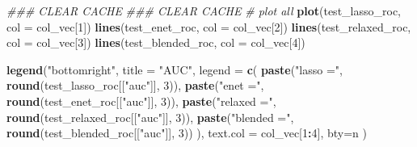 \documentclass[
]{book}
\newenvironment{Shaded}{\begin{snugshade}}{\end{snugshade}}
\newcommand{\CommentTok}[1]{\textcolor[rgb]{0.56,0.35,0.01}{\textit{#1}}}
\newcommand{\DataTypeTok}[1]{\textcolor[rgb]{0.13,0.29,0.53}{#1}}
\newcommand{\DecValTok}[1]{\textcolor[rgb]{0.00,0.00,0.81}{#1}}
\newcommand{\KeywordTok}[1]{\textcolor[rgb]{0.13,0.29,0.53}{\textbf{#1}}}
\newcommand{\NormalTok}[1]{#1}
\newcommand{\OperatorTok}[1]{\textcolor[rgb]{0.81,0.36,0.00}{\textbf{#1}}}
\newcommand{\StringTok}[1]{\textcolor[rgb]{0.31,0.60,0.02}{#1}}
\begin{document}
\begin{Shaded}
\begin{Highlighting}[]
\CommentTok{\#\#\# CLEAR CACHE}
\CommentTok{\#\#\# CLEAR CACHE}
\CommentTok{\# plot all}
\KeywordTok{plot}\NormalTok{(test\_lasso\_roc, }\DataTypeTok{col =}\NormalTok{ col\_vec[}\DecValTok{1}\NormalTok{])}
\KeywordTok{lines}\NormalTok{(test\_enet\_roc, }\DataTypeTok{col =}\NormalTok{ col\_vec[}\DecValTok{2}\NormalTok{])}
\KeywordTok{lines}\NormalTok{(test\_relaxed\_roc, }\DataTypeTok{col =}\NormalTok{ col\_vec[}\DecValTok{3}\NormalTok{])}
\KeywordTok{lines}\NormalTok{(test\_blended\_roc, }\DataTypeTok{col =}\NormalTok{ col\_vec[}\DecValTok{4}\NormalTok{])}

\KeywordTok{legend}\NormalTok{(}\StringTok{"bottomright"}\NormalTok{,}
  \DataTypeTok{title =} \StringTok{"AUC"}\NormalTok{,}
  \DataTypeTok{legend =} \KeywordTok{c}\NormalTok{(}
    \KeywordTok{paste}\NormalTok{(}\StringTok{"lasso ="}\NormalTok{, }\KeywordTok{round}\NormalTok{(test\_lasso\_roc[[}\StringTok{"auc"}\NormalTok{]], }\DecValTok{3}\NormalTok{)),}
    \KeywordTok{paste}\NormalTok{(}\StringTok{"enet ="}\NormalTok{, }\KeywordTok{round}\NormalTok{(test\_enet\_roc[[}\StringTok{"auc"}\NormalTok{]], }\DecValTok{3}\NormalTok{)),}
    \KeywordTok{paste}\NormalTok{(}\StringTok{"relaxed ="}\NormalTok{, }\KeywordTok{round}\NormalTok{(test\_relaxed\_roc[[}\StringTok{"auc"}\NormalTok{]], }\DecValTok{3}\NormalTok{)),}
    \KeywordTok{paste}\NormalTok{(}\StringTok{"blended ="}\NormalTok{, }\KeywordTok{round}\NormalTok{(test\_blended\_roc[[}\StringTok{"auc"}\NormalTok{]], }\DecValTok{3}\NormalTok{))}
\NormalTok{  ),}
  \DataTypeTok{text.col =}\NormalTok{ col\_vec[}\DecValTok{1}\OperatorTok{:}\DecValTok{4}\NormalTok{],}
  \DataTypeTok{bty=}\StringTok{\textquotesingle{}n\textquotesingle{}}
\NormalTok{)}
\end{Highlighting}
\end{Shaded}
\end{document}
